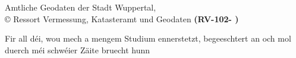 


\newcommand{\incgraph}[2]{\IfFileExists{#2}{\texttt{[image: \#2]}}{\texttt{[image: ./img/dummy.png]}}}

\usepackage{rotating}
\addto{}
\usepackage{tabulary}
\usepackage{caption}
\usepackage{wrapfig}

\newcommand\blankpage{%
   \newpage
\thispagestyle{empty}
\mbox{}}

\newenvironment{dedica}
  {\clearpage           %
   \thispagestyle{empty}%
   \vspace*{\stretch{1}}%
   \itshape             %
   \raggedleft          %
  }
  {\par %
   \vspace{\stretch{3}} %
   \clearpage           %
  }






\blankpage

\blankpage

\newpage
\vspace*{\fill}
Amtliche Geodaten der Stadt Wuppertal, \\
© Ressort Vermessung, Katasteramt und Geodaten \textbf{(RV-102- )}
\newpage
\blankpage


\blankpage

\begin{dedica}
Fir all déi, wou mech a mengem Studium ennerstetzt, begeeschtert an och mol duerch méi schwéier Zäite bruecht hunn
\end{dedica}


\tableofcontents






\nocite{bezk-alkis}

\begingroup
\sloppy
\singlespacing
\printbibliography
\endgroup

\begingroup
\singlespacing

\endgroup
\listoffigures
\listoftables


 

